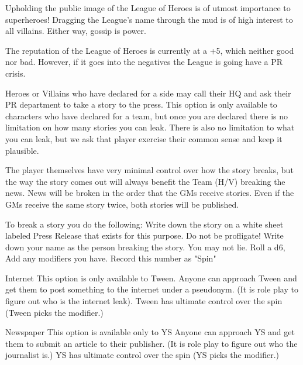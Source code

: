 \documentclass[green]{LRSguildcamp1}
\begin{document}
\name{\gNewspaperPR{}}

Upholding the public image of the League of Heroes is of utmost importance to superheroes! 
Dragging the League's name through the mud is of high interest to all villains. Either way, gossip is power. 

The reputation of the League of Heroes is currently at a +5, which neither good nor bad. However, if it goes into the negatives the League is going have a PR crisis. 

Heroes or Villains who have declared for a side may call their HQ and ask their PR department to take a story to the press. This option is only available to characters who have declared for a team, but once you are declared there is no limitation on how many stories you can leak. There is also no limitation to what you can leak, but we ask that player exercise their common sense and keep it plausible. 

The player themselves have very minimal control over how the story breaks, but the way the story comes out will always benefit the Team (H/V) breaking the news. News will be broken in the order that the GMs receive stories. Even if the GMs receive the same story twice, both stories will be published. 

To break a story you do the following:
Write down the story on a white sheet labeled Press Release that exists for this purpose. Do not be profligate! 
Write down your name as the person breaking the story. You may not lie. 
Roll a d6, Add any modifiers you have. Record this number as "Spin"




Internet
This option is only available to Tween.
Anyone can approach Tween and get them to post something to the internet under a pseudonym. (It is role play to figure out who is the internet leak). Tween has ultimate control over the spin (Tween picks the modifier.)

Newspaper
This option is available only to YS
Anyone can approach YS and get them to submit an article to their publisher. (It is role play to figure out who the journalist is.) YS has ultimate control over the spin (YS picks the modifier.)
\end{document}
